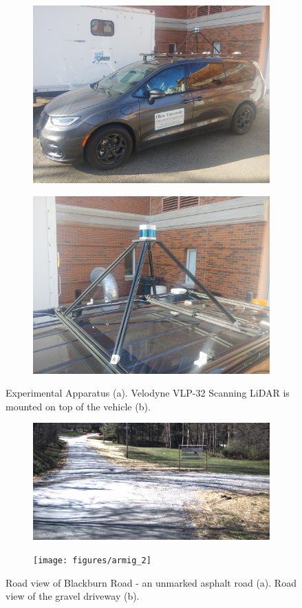 \documentclass[journal,onecolumn]{IEEEtran}
\begin{document}
	\begin{figure}[H] 
		\centering
		\begin{subfigure}{0.45\textwidth}
			\centering
			\includegraphics[width=0.9\linewidth,height=4.60 cm,keepaspectratio]{figures/van_on_van}
			\caption[Sensor Van]{}
			\label{fig:van}
		\end{subfigure}
		\begin{subfigure}{0.45\textwidth}
			\centering
			\includegraphics[width=0.9\linewidth,height=4.60 cm,keepaspectratio]{figures/LiDAR_on_van}
			\caption[VLP 32 on Van]{}
			\label{fig:vlp32mount}
		\end{subfigure}
		\caption[Experimental Apparatus]{Experimental Apparatus (a). Velodyne VLP-32 Scanning LiDAR is mounted on top of the vehicle (b).}
		\label{fig:Experimental_Apperatus}
	\end{figure}

	\begin{figure}[H]
		\centering
		\begin{subfigure}{0.45\textwidth}
			\centering
			\includegraphics[width=1.0\linewidth,height=5.0 cm,keepaspectratio]{figures/vlcsnap-2023-04-20-08h48m17s447}
			\caption[Blackburn Road Camera View]{}
			\label{fig:Bean_Cam_View}
		\end{subfigure}
		\begin{subfigure}{0.45\textwidth}
			\centering
			\texttt{[image: figures/armig\_2]}
			\caption[Armig Road Camera View]{}
			\label{fig:Armig_Road_Camera_View}
		\end{subfigure}
		\caption[Blackburn Road \& Gravel Parking Lot]{Road view of Blackburn Road - an unmarked asphalt road (a). Road view of the gravel driveway (b).}
		\label{fig:Combined_Roads}
	\end{figure}
\end{document}
